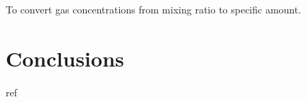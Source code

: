 To convert gas concentrations from mixing ratio to specific amount.



\section{Conclusions}



\begin{thebibliography}{99}
   ref
\end{thebibliography}



\begin{appendix}

%  
%  

\end{appendix}




